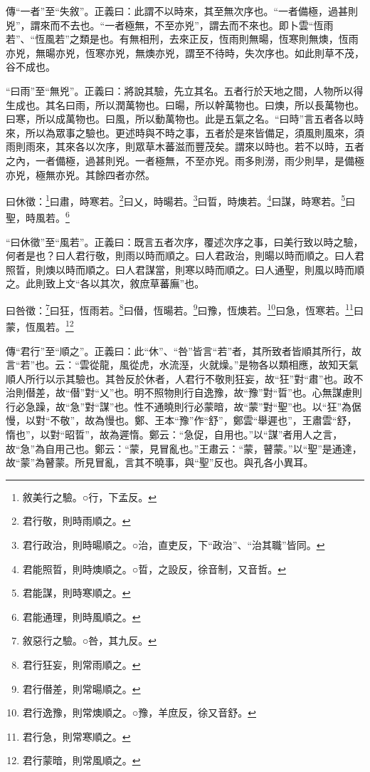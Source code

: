 {\noindent\zhuan{}\fzbyks 傳“一者”至“失敘”。正義曰：此謂不以時來，其至無次序也。“一者備極，過甚則兇”，謂來而不去也。“一者極無，不至亦兇”，謂去而不來也。即卜雲“恆雨若”、“恆風若”之類是也。有無相刑，去來正反，恆雨則無暘，恆寒則無燠，恆雨亦兇，無暘亦兇，恆寒亦兇，無燠亦兇，謂至不待時，失次序也。如此則草不茂，谷不成也。 \par}

{\noindent\shu{}\fzkt “曰雨”至“無兇”。正義曰：將說其驗，先立其名。五者行於天地之間，人物所以得生成也。其名曰雨，所以潤萬物也。曰暘，所以幹萬物也。曰燠，所以長萬物也。曰寒，所以成萬物也。曰風，所以動萬物也。此是五氣之名。“曰時”言五者各以時來，所以為眾事之驗也。更述時與不時之事，五者於是來皆備足，須風則風來，須雨則雨來，其來各以次序，則眾草木蕃滋而豐茂矣。謂來以時也。若不以時，五者之內，一者備極，過甚則兇。一者極無，不至亦兇。雨多則澇，雨少則旱，是備極亦兇，極無亦兇。其餘四者亦然。 \par}

曰休徵：\footnote{敘美行之驗。○行，下孟反。}曰肅，時寒若。\footnote{君行敬，則時雨順之。}曰乂，時暘若。\footnote{君行政治，則時暘順之。○治，直吏反，下“政治”、“治其職”皆同。}曰晢，時燠若。\footnote{君能照晢，則時燠順之。○晢，之設反，徐音制，又音哲。}曰謀，時寒若。\footnote{君能謀，則時寒順之。}曰聖，時風若。\footnote{君能通理，則時風順之。}

{\noindent\shu{}\fzkt “曰休徵”至“風若”。正義曰：既言五者次序，覆述次序之事，曰美行致以時之驗，何者是也？曰人君行敬，則雨以時而順之。曰人君政治，則暘以時而順之。曰人君照晢，則燠以時而順之。曰人君謀當，則寒以時而順之。曰人通聖，則風以時而順之。此則致上文“各以其次，敘庶草蕃廡”也。 \par}

曰咎徵：\footnote{敘惡行之驗。○咎，其九反。}曰狂，恆雨若。\footnote{君行狂妄，則常雨順之。}曰僣，恆暘若。\footnote{君行僣差，則常暘順之。}曰豫，恆燠若。\footnote{君行逸豫，則常燠順之。○豫，羊庶反，徐又音舒。}曰急，恆寒若。\footnote{君行急，則常寒順之。}曰蒙，恆風若。\footnote{君行蒙暗，則常風順之。}

{\noindent\zhuan{}\fzbyks 傳“君行”至“順之”。正義曰：此“休”、“咎”皆言“若”者，其所致者皆順其所行，故言“若”也。云：“雲從龍，風從虎，水流溼，火就燥。”是物各以類相應，故知天氣順人所行以示其驗也。其咎反於休者，人君行不敬則狂妄，故“狂”對“肅”也。政不治則僣差，故“僣”對“乂”也。明不照物則行自逸豫，故“豫”對“晢”也。心無謀慮則行必急躁，故“急”對“謀”也。性不通曉則行必蒙暗，故“蒙”對“聖”也。以“狂”為倨慢，以對“不敬”，故為慢也。鄭、王本“豫”作“舒”，鄭雲“舉遲也”，王肅雲“舒，惰也”，以對“昭晢”，故為遲惰。鄭云：“急促，自用也。”以“謀”者用人之言，故“急”為自用己也。鄭云：“蒙，見冒亂也。”王肅云：“蒙，瞽蒙。”以“聖”是通達，故“蒙”為瞽蒙。所見冒亂，言其不曉事，與“聖”反也。與孔各小異耳。 \par}

